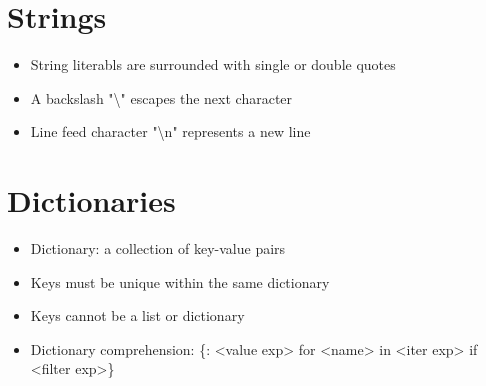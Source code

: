 \section{Strings}
\begin{itemize}
    \item String literabls are surrounded with single or double quotes
    \item A backslash "\textbackslash" escapes the next character
    \item Line feed character "\textbackslash n" represents a new line
\end{itemize}

\section{Dictionaries}
\begin{itemize}
    \item Dictionary: a collection of key-value pairs
    \item Keys must be unique within the same dictionary
    \item Keys cannot be a list or dictionary
    \item Dictionary comprehension: \{<key exp>: <value exp> for <name> in <iter exp> if <filter exp>\}
\end{itemize}